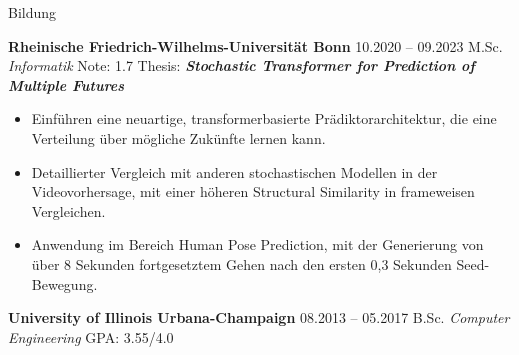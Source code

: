 \begin{rubric}{Bildung}


\entry*[] \textbf{Rheinische Friedrich-Wilhelms-Universität Bonn} \hfill 10.2020 -- 09.2023  \newline
  M.Sc. \emph{Informatik}  \hfill Note:  1.7 \newline %
  {Thesis}:  \hspace*{5mm} \textit{\textbf{Stochastic Transformer for Prediction of Multiple Futures}} \newline 
  \vspace{\CVItemizeHeaderSpacing} \begin{itemize}[leftmargin=*, rightmargin=1cm]
  	\setlength{\itemsep}{\CVItemizeSpacing}  
  	\item Einführen eine neuartige, transformerbasierte Prädiktorarchitektur, die eine Verteilung über mögliche Zukünfte lernen kann.  
  	\item Detaillierter Vergleich mit anderen stochastischen Modellen in der Videovorhersage, mit einer höheren Structural Similarity in frameweisen Vergleichen.  
  	\item Anwendung im Bereich Human Pose Prediction, mit der Generierung von über 8 Sekunden fortgesetztem Gehen nach den ersten 0,3 Sekunden Seed-Bewegung.  
 \end{itemize}

\entry*[] \textbf{University of Illinois Urbana-Champaign} \hfill 08.2013 -- 05.2017  \newline
 B.Sc. \emph{Computer Engineering} \hfill GPA: 3.55/4.0 \newline %



\end{rubric}
